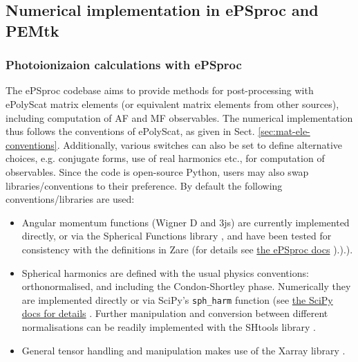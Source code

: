 \subsection{Numerical implementation in ePSproc and PEMtk\label{sec:numerical-notes}}

\subsubsection{Photoionizaion calculations with ePSproc}

The ePSproc codebase \cite{ePSprocAuthorea, ePSprocGithub, ePSprocDocs} aims to provide methods for post-processing with ePolyScat matrix elements (or equivalent matrix elements from other sources), including computation of AF and MF observables. The numerical implementation thus follows the conventions of ePolyScat, as given in Sect. \ref{sec:mat-ele-conventions}. Additionally, various switches can also be set to define alternative choices, e.g. conjugate forms, use of real harmonics etc., for computation of observables. Since the code is open-source Python, users may also swap libraries/conventions to their preference. By default the following conventions/libraries are used:

\begin{itemize}
\item Angular momentum functions (Wigner D and 3js) are currently implemented directly, or via the Spherical Functions library \cite{boyle2022SphericalFunctions}, and have been tested for consistency with the definitions in Zare (for details see \href{https://epsproc.readthedocs.io/en/latest/tests/Spherical_function_testing_Aug_2019.html}{the ePSproc docs} \cite{ePSprocDocs}).\cite{ePSprocDocs}).\cite{ePSprocDocs}).
\item Spherical harmonics are defined with the usual physics conventions: orthonormalised, and including the Condon-Shortley phase. Numerically they are implemented directly or via SciPy's \verb+sph_harm+ function (see \href{https://docs.scipy.org/doc/scipy/reference/generated/scipy.special.sph_harm.html}{the SciPy docs for details} \cite{SciPyDocumentation}. Further manipulation and conversion between different normalisations can be readily implemented with the SHtools library \cite{wieczorek2018SHToolsToolsWorking,SHtoolsGithub}.
\item General tensor handling and manipulation makes use of the Xarray library \cite{hoyer2017XarrayNDLabeled,XarrayDocumentation}.
\end{itemize}


